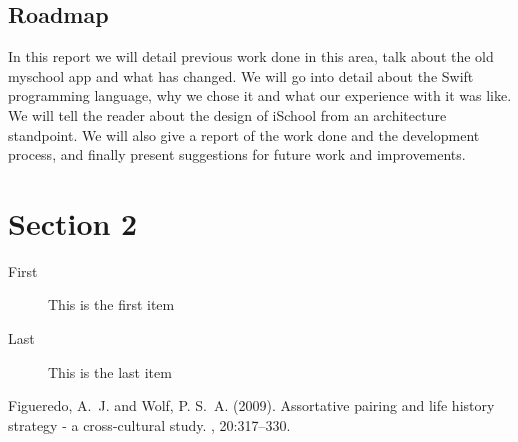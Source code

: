\documentclass[DIV=calc, paper=a4, fontsize=11pt, twocolumn]{scrartcl}	 %
\begin{document}

\subsection*{Roadmap}

In this report we will detail previous work done in this area, talk about the old myschool app
and what has changed. We will go into detail about the Swift programming language, why we chose it
and what our experience with it was like. We will tell the reader about the design of iSchool from
an architecture standpoint. We will also give a report of the work done and the development process,
and finally present suggestions for future work and improvements.



\section*{Section 2}

\lipsum[8] %

\begin{description}
\item[First] This is the first item
\item[Last] This is the last item
\end{description}

\lipsum[9] %


\begin{thebibliography}{99} %

Figueredo, A.~J. and Wolf, P. S.~A. (2009).
\newblock Assortative pairing and life history strategy - a cross-cultural
  study.
, 20:317--330.
 
\end{thebibliography}

\end{document}
